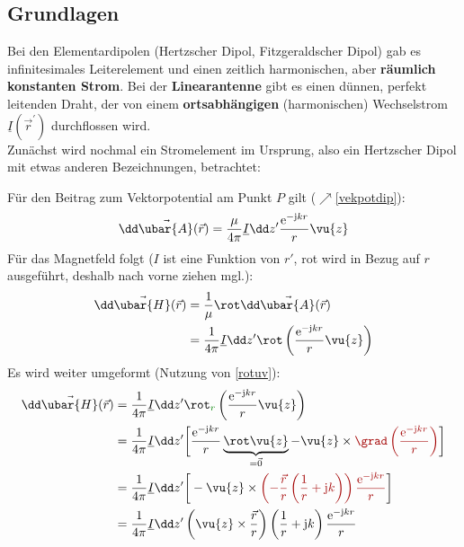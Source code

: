   \subsection{Grundlagen}
	 Bei den Elementardipolen (Hertzscher Dipol, Fitzgeraldscher Dipol) gab es infinitesimales Leiterelement und einen zeitlich harmonischen, aber \textbf{räumlich konstanten Strom}. Bei der \textbf{Linearantenne} gibt es einen dünnen, perfekt leitenden Draht, der von einem \textbf{ortsabhängigen} (harmonischen) Wechselstrom \(\underline{I}(\vec{r}^\prime )\) durchflossen wird. \\
	 Zunächst wird nochmal ein Stromelement im Ursprung, also ein Hertzscher Dipol mit etwas anderen Bezeichnungen, betrachtet:
		        \begin{center}
			        
		        \end{center}
		  Für den Beitrag zum Vektorpotential am Punkt \(P\) gilt ($\nearrow$\ref{vekpotdip}):
		        \begin{equation}
			        \dd \vec{\ubar{A}}(\vec{r} ) = \frac{\mu}{4\pi} \underline{I} \dd z^\prime \frac{ \mathrm{e}^{-\mathrm{j} kr}}{r} \vu{z}
		        \end{equation}
		  Für das Magnetfeld folgt ($I$ ist eine Funktion von $r'$, rot wird in Bezug auf $r$ ausgeführt, deshalb nach vorne ziehen mgl.):
		        \begin{equation}\begin{split}
				        \dd\vec{\ubar{H}}(\vec{r} ) &= \frac{1}{\mu} \rot \dd \vec{\ubar{A}}(\vec{r} )\\
				        &= \frac{1}{4\pi} \underline{I} \dd z^\prime \rot \left(\frac{ \mathrm{e}^{-\mathrm{j} kr}}{r} \vu{z}\right)
			        \end{split}\end{equation}
Es wird weiter umgeformt (Nutzung von \ref{rotuv}):
		        \begin{equation}\begin{split}
				        \dd\vec{\ubar{H}}(\vec{r} )  &= \frac{1}{4\pi}\underline{I} \dd z^\prime \rot _{\textcolor{green}{r}}\left(\frac{ \mathrm{e}^{-\mathrm{j} kr}}{r} \vu{z}\right) \\
				        &= \frac{1}{4\pi} \underline{I}\dd z^\prime \bigg[ \frac{ \mathrm{e}^{-\mathrm{j} kr}}{r} \underbrace{\rot \vu{z}}_{=\vec{0}} - \vu{z} \times \textcolor{red}{\grad \left( \frac{ \mathrm{e}^{-\mathrm{j} kr}}{r} \right)}\bigg] \\
				        &= \frac{1}{4\pi} \underline{I}\dd z^\prime \bigg[- \vu{z} \times \textcolor{red}{\left( -\frac{\vec{r} }{r} \left(\frac{1}{r} +\mathrm{j} k \right)   \right) \frac{ \mathrm{e}^{-\mathrm{j} kr}}{r}} \bigg]\\
				        &= \frac{1}{4\pi} \underline{I}\dd z^\prime \left( \vu{z} \times \frac{\vec{r} }{r} \right) \left(\frac{1}{r} +\mathrm{j} k \right) \frac{ \mathrm{e}^{-\mathrm{j} kr}}{r}
			        \end{split}\end{equation}
